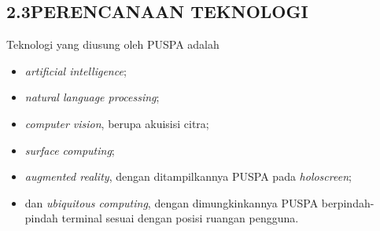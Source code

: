 \subsection*{\textsf{\normalsize 2.3\hspace{0.5cm}PERENCANAAN TEKNOLOGI}}

Teknologi yang diusung oleh PUSPA adalah
\begin{itemize}
	\item \textit{artificial intelligence};
	\item \textit{natural language processing};
	\item \textit{computer vision}, berupa akuisisi citra;
	\item \textit{surface computing};
	\item \textit{augmented reality},	dengan ditampilkannya PUSPA pada \textit{holoscreen};
	\item dan \textit{ubiquitous computing}, dengan dimungkinkannya PUSPA berpindah-pindah terminal sesuai dengan posisi ruangan pengguna.
\end{itemize}
